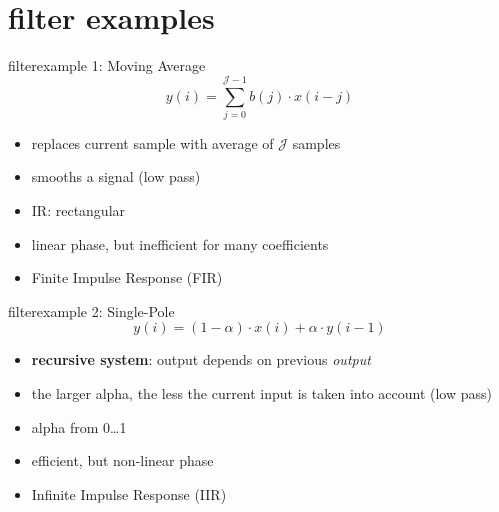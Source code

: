     \section{filter examples}
        \begin{frame}{filter}{example 1: Moving Average}
            \begin{equation*}
                y(i) = \sum\limits_{j=0}^{\mathcal{J}-1}{b(j)\cdot x(i-j)}
            \end{equation*} 
            
            \begin{itemize}
                \item   replaces current sample with average of $\mathcal{J}$ samples
                \item   smooths a signal (low pass)
                \item   IR: rectangular
                \item   linear phase, but inefficient for many coefficients
                \item   Finite Impulse Response (FIR)
            \end{itemize}
        
        \end{frame}	

        \begin{frame}{filter}{example 2: Single-Pole}
            \begin{equation*}
                y(i) = (1-\alpha)\cdot x(i) + \alpha\cdot y(i-1)
            \end{equation*}
            
            \begin{itemize}
                \item   \textbf{recursive system}: output depends on previous \textit{output}
                \item   the larger alpha, the less the current input is taken into account (low pass)
                \item   alpha from 0\ldots 1
                \item   efficient, but non-linear phase
                \item   Infinite Impulse Response (IIR)
            \end{itemize}
        \end{frame}	

